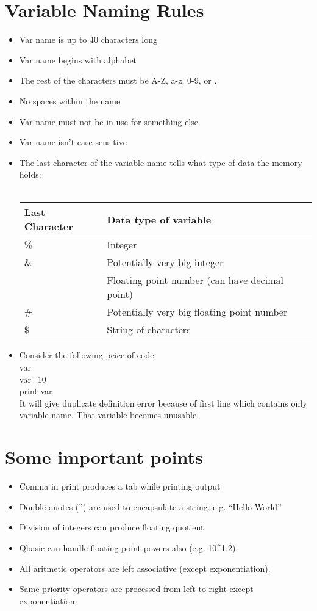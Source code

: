 \documentclass[a4paper,11pt]{article}
\begin{document}
 \section{\color{red}Variable Naming Rules}
 \begin{itemize}
  \item Var name is up to 40 characters long
  \item Var name begins with alphabet
  \item The rest of the characters must be A-Z, a-z, 0-9, or .
  \item No spaces within the name
  \item Var name must not be in use for something else
  \item Var name isn't case sensitive
  \item The last character of the variable name tells what type of data the memory holds:\\ \\
  \begin{tabular}{| l | l |}
    \hline
    \textbf{Last Character} & \textbf{Data type of variable} \\ \hline
    \% & Integer \\ \hline
    \& & Potentially very big integer \\ \hline
    [No Special symbol] & Floating point number (can have decimal point) \\ \hline
    \# & Potentially very big floating point number \\ \hline
    \$ & String of characters \\ \hline
  \end{tabular}

  \item Consider the following peice of code:\\var\\var=10\\print var\\It will give duplicate definition error because of first line which contains only variable name. That variable becomes unusable.
 \end{itemize}

 
 \section{\color{red}Some important points}
 
 \begin{itemize}
  \item Comma in print produces a tab while printing output
  \item Double quotes ('') are used to encapsulate a string. e.g. ``Hello World''
  \item Division of integers can produce floating quotient
  \item Qbasic can handle floating point powers also (e.g. 10\^{}1.2).
  \item All aritmetic operators are left associative (except exponentiation).
  \item Same priority operators are processed from left to right except exponentiation.
  
 \end{itemize}
\end{document}
